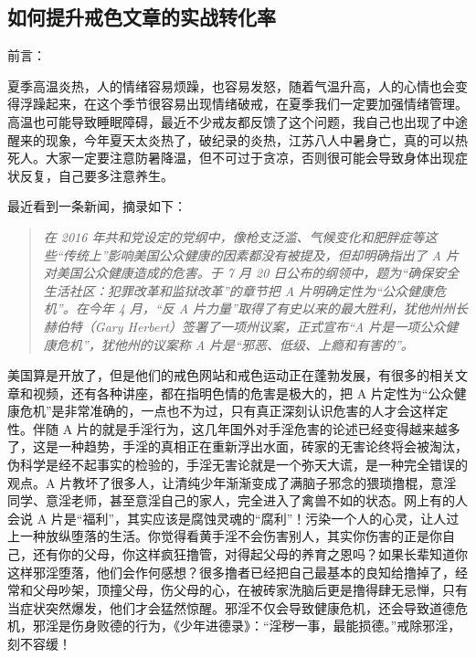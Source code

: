 \subsection{如何提升戒色文章的实战转化率}

前言：

夏季高温炎热，人的情绪容易烦躁，也容易发怒，随着气温升高，人的心情也会变得浮躁起来，在这个季节很容易出现情绪破戒，在夏季我们一定要加强情绪管理。高温也可能导致睡眠障碍，最近不少戒友都反馈了这个问题，我自己也出现了中途醒来的现象，今年夏天太炎热了，破纪录的炎热，江苏八人中暑身亡，真的可以热死人。大家一定要注意防暑降温，但不可过于贪凉，否则很可能会导致身体出现症状反复，自己要多注意养生。

最近看到一条新闻，摘录如下：

\begin{quote}\it
    在 2016 年共和党设定的党纲中，像枪支泛滥、气候变化和肥胖症等这些“传统上”影响美国公众健康的因素都没有被提及，但却明确指出了 A 片对美国公众健康造成的危害。于 7 月 20 日公布的纲领中，题为“确保安全生活社区：犯罪改革和监狱改革”的章节把 A 片明确定性为“公众健康危机”。在今年 4 月，“反 A 片力量”取得了有史以来的最大胜利，犹他州州长赫伯特（Gary Herbert）签署了一项州议案，正式宣布“A 片是一项公众健康危机”，犹他州的议案称 A 片是“邪恶、低级、上瘾和有害的”。
\end{quote}

美国算是开放了，但是他们的戒色网站和戒色运动正在蓬勃发展，有很多的相关文章和视频，还有各种讲座，都在指明色情的危害是极大的，把 A 片定性为“公众健康危机”是非常准确的，一点也不为过，只有真正深刻认识危害的人才会这样定性。伴随 A 片的就是手淫行为，这几年国外对手淫危害的论述已经变得越来越多了，这是一种趋势，手淫的真相正在重新浮出水面，砖家的无害论终将会被淘汰，伪科学是经不起事实的检验的，手淫无害论就是一个弥天大谎，是一种完全错误的观点。A 片教坏了很多人，让清纯少年渐渐变成了满脑子邪念的猥琐撸棍，意淫同学、意淫老师，甚至意淫自己的家人，完全进入了禽兽不如的状态。网上有的人会说 A 片是“福利”，其实应该是腐蚀灵魂的“腐利”！污染一个人的心灵，让人过上一种放纵堕落的生活。你觉得看黄手淫不会伤害别人，其实你伤害的正是你自己，还有你的父母，你这样疯狂撸管，对得起父母的养育之恩吗？如果长辈知道你这样邪淫堕落，他们会作何感想？很多撸者已经把自己最基本的良知给撸掉了，经常和父母吵架，顶撞父母，伤父母的心，在被砖家洗脑后更是撸得肆无忌惮，只有当症状突然爆发，他们才会猛然惊醒。邪淫不仅会导致健康危机，还会导致道德危机，邪淫是伤身败德的行为，《少年进德录》：“淫秽一事，最能损德。”戒除邪淫，刻不容缓！

